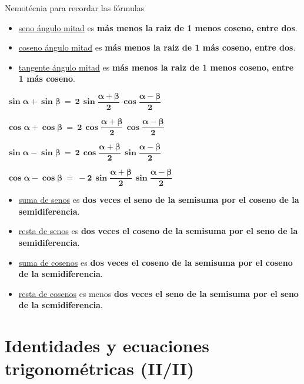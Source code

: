\begin{myexampleblock}{Nemotécnia para recordar las fórmulas}
\begin{itemize}
\item \underline{seno ángulo mitad} es \textbf{más menos la raiz de 1 menos coseno, entre dos}.	
\item \underline{coseno ángulo mitad} es \textbf{más menos la raiz de 1 más coseno, entre dos}.
\item \underline{tangente ángulo mitad} es \textbf{más menos la raiz de 1 menos coseno, entre 1 más coseno}.
\end{itemize}


\vspace{3mm}
\begin{multicols}{2}

$\ \boldsymbol{  \sin \alpha + \sin \beta \ = \ 2 \, \sin \dfrac{\alpha + \beta}{2}\, \cos \dfrac{\alpha - \beta}{2} }  \ $

\vspace{3mm} $ \ \boldsymbol{ \cos \alpha + \cos \beta \ = \ 2 \, \cos \dfrac{\alpha + \beta}{2}\, \cos \dfrac{\alpha - \beta}{2} }  \ $

$ \ \boldsymbol{ \sin \alpha - \sin \beta \ = \ 2 \, \cos \dfrac{\alpha + \beta}{2}\, \sin \dfrac{\alpha - \beta}{2}  }  \ $

\vspace{3mm} $ \ \boldsymbol{  \cos \alpha - \cos \beta \ = \ - 2 \, \sin \dfrac{\alpha + \beta}{2}\, \sin \dfrac{\alpha - \beta}{2} }  \ $
\end{multicols}

\begin{itemize} 
\item \underline{suma de senos} es \textbf{dos veces el seno de la semisuma por el coseno de la semidiferencia}.
\item \underline{resta de senos} es \textbf{dos veces el coseno de la semisuma por el seno de la semidiferencia}.
\item \underline{suma de cosenos} es \textbf{dos veces el coseno de la semisuma por el coseno de la semidiferencia}.	
\item \underline{resta de cosenos} es menos \textbf{dos veces el seno de la semisuma por el seno de la semidiferencia}.	
\end{itemize}

\end{myexampleblock}




\vspace{5mm}
\section{Identidades y ecuaciones trigonométricas (II/II)}
\vspace{1cm}

